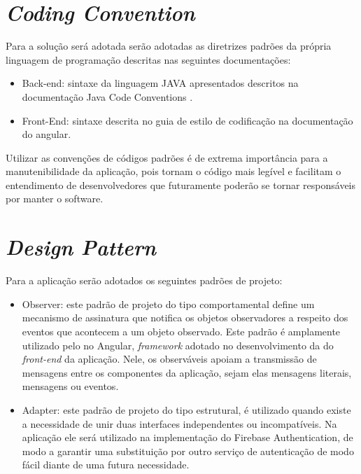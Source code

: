 \section{\textit{Coding Convention}}
Para a solução será adotada serão adotadas as diretrizes padrões da própria linguagem de programação descritas nas seguintes documentações:

\begin{itemize}
\item Back-end: sintaxe da linguagem JAVA  apresentados descritos na documentação Java Code Conventions \cite{javacodeconvention:1997}.
\item Front-End: sintaxe descrita no guia de estilo de codificação na documentação do angular. \cite{angularstyleguide:2021} 
\end{itemize}


Utilizar as convenções de códigos padrões é de extrema importância para a manutenibilidade da aplicação, pois tornam o código mais legível e facilitam o entendimento de desenvolvedores que futuramente poderão se tornar responsáveis por manter o software.



\section{\textit{Design Pattern}}
Para a aplicação serão adotados os seguintes padrões de projeto:
\begin{itemize}
\item  Observer: este padrão de projeto do tipo comportamental define um mecanismo de assinatura que notifica os objetos observadores a respeito dos eventos que acontecem a um objeto observado. 
Este padrão é amplamente utilizado pelo no Angular, \textit{\gls{framework}} adotado no desenvolvimento da do \textit{\gls{front-end}} da aplicação. Nele, os observáveis apoiam a transmissão de mensagens entre os componentes da aplicação, sejam elas mensagens literais, mensagens ou eventos.
\item Adapter: este padrão de projeto do tipo estrutural, é utilizado quando existe a necessidade de unir duas interfaces independentes ou incompatíveis. Na aplicação ele será utilizado na implementação do Firebase Authentication, de modo a garantir uma substituição por outro serviço de autenticação de modo fácil diante de uma futura necessidade.
\end{itemize}
